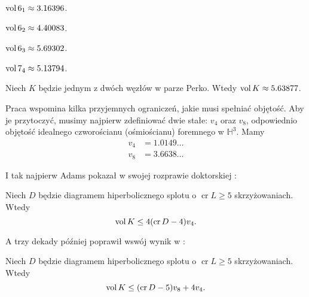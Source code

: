 \begin{example}
    $\operatorname{vol} 6_1 \approx 3.16396$.
\end{example}

\begin{example}
    $\operatorname{vol} 6_2 \approx 4.40083$.
\end{example}

\begin{example}
    $\operatorname{vol} 6_3 \approx 5.69302$.
\end{example}

\begin{example}
    $\operatorname{vol} 7_4 \approx 5.13794$.
\end{example}

\begin{example}
    Niech $K$ będzie jednym z dwóch węzłów w parze Perko.
    Wtedy $\operatorname{vol} K \approx 5.63877$.
\end{example}

Praca \cite{purcell19} wspomina kilka przyjemnych ograniczeń, jakie musi spełniać objętość.
Aby je przytoczyć, musimy najpierw zdefiniować dwie stałe: $v_4$ oraz $v_8$, odpowiednio objętość idealnego czworościanu (ośmiościanu) foremnego w $\mathbb H^3$.
Mamy
\begin{align}
    v_4 & = 1.0149\ldots \\
    v_8 & = 3.6638\ldots
\end{align}

I tak najpierw Adams pokazał w swojej rozprawie doktorskiej \cite{adams83}:

\begin{proposition}
    Niech $D$ będzie diagramem hiperbolicznego splotu o $\operatorname{cr} L \ge 5$ skrzyżowaniach.
    Wtedy
    \begin{equation}
        \operatorname{vol} K \le 4 (\operatorname{cr} D - 4) v_4.
    \end{equation} 
\end{proposition}

A trzy dekady później poprawił wswój wynik w \cite{adams13}:

\begin{proposition}
    Niech $D$ będzie diagramem hiperbolicznego splotu o $\operatorname{cr} L \ge 5$ skrzyżowaniach.
    Wtedy
    \begin{equation}
        \operatorname{vol} K \le (\operatorname{cr} D - 5) v_8 + 4v_4.
    \end{equation} 
\end{proposition}

